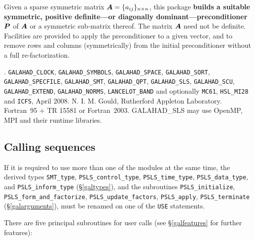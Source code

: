 \documentclass{galahad}
\newcommand{\packagename}{PSLS}
\newcommand{\fullpackagename}{\libraryname\_\-\packagename}
\begin{document}
\galheader


\galsummary

Given a sparse symmetric matrix ${\bm{A}} = \{ a_{ij} \}_{n \times n}$, this package
{\bf builds a suitable symmetric, positive definite---or 
diagonally dominant---preconditioner ${\bm{P}}$} of ${\bm{A}}$ or a symmetric 
sub-matrix thereof. The matrix ${\bm{A}}$ need not be definite. Facilities
are provided to apply the preconditioner to a given vector, and to
remove rows and columns (symmetrically) from the initial preconditioner
without a full re-factorization.


\galattributes
\galversions{\tt  \fullpackagename\_single, \fullpackagename\_double}.
\galcalls
{\tt GALAHAD\_CLOCK},
{\tt GALAHAD\-\_SYMBOLS},
{\tt GALAHAD\_SPACE},
{\tt GALAHAD\_\-SORT},
{\tt GALAHAD\_SPECFILE},
{\tt GALAHAD\_SMT},
{\tt GALAHAD\_QPT},
{\tt GALAHAD\_SLS},
{\tt GALA\-HAD\_SCU},
{\tt GALAHAD\_EXTEND},
{\tt GALAHAD\_NORMS},
{\tt LANCELOT\_BAND}
and optionally
{\tt MC61},
{\tt HSL\_\-MI28} and
{\tt ICFS},
\galdate April 2008.
\galorigin N. I. M. Gould, Rutherford Appleton Laboratory.
\gallanguage Fortran~95 + TR 15581 or Fortran~2003.
\galparallelism GALAHAD\_SLS may use OpenMP, MPI and their runtime libraries.


\galhowto

\subsection{Calling sequences}



\noindent
If it is required to use more than one of the modules at the same time, 
the derived types
{\tt SMT\_type},
{\tt \packagename\_control\_type},
{\tt \packagename\_time\-\_type},
{\tt \packagename\_data\-\_type}, and
{\tt \packagename\_inform\_type}
(\S\ref{galtypes}),
and the subroutines
{\tt \packagename\_initialize},
{\tt \packagename\-\_form\_and\_fact\-orize},
{\tt \packagename\-\_update\_factors},
{\tt \packagename\_apply},
{\tt \packagename\_terminate}
(\S\ref{galarguments}),
must be renamed on one of the {\tt USE} statements.

\noindent There are five principal subroutines for user calls (see
\S\ref{galfeatures} for further features):
\end{document}
